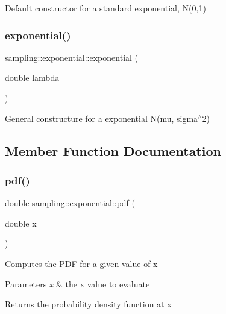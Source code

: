 Default constructor for a standard exponential, N(0,1) \mbox{\label{classsampling_1_1exponential_a1fd04756818bbbd7e52f48aab791a66d}} 
\subsubsection{\texorpdfstring{exponential()}{exponential()}\hspace{0.1cm}{\footnotesize\ttfamily [2/2]}}
{\footnotesize\ttfamily sampling\+::exponential\+::exponential (\begin{DoxyParamCaption}\item[{double}]{lambda }\end{DoxyParamCaption})}

General constructure for a exponential N(mu, sigma$^\wedge$2) 

\subsection{Member Function Documentation}
\mbox{\label{classsampling_1_1exponential_aa839d6994b83c79b91993b35bb8173e9}} 
\subsubsection{\texorpdfstring{pdf()}{pdf()}}
{\footnotesize\ttfamily double sampling\+::exponential\+::pdf (\begin{DoxyParamCaption}\item[{double}]{x }\end{DoxyParamCaption})}

Computes the P\+DF for a given value of x 
\begin{DoxyParams}{Parameters}
{\em x} & the x value to evaluate \\
\hline
\end{DoxyParams}
\begin{DoxyReturn}{Returns}
the probability density function at x 
\end{DoxyReturn}
\mbox{\label{classsampling_1_1exponential_af1a70f21711c1a0da8643c0103b51f37}} 
